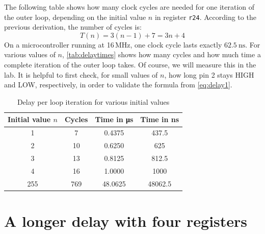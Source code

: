\documentclass[a4paper,12pt]{article}
\begin{document}
The following table shows how many clock cycles are needed for one iteration
of the outer loop, depending on the initial value \( n \) in register
\texttt{r24}. According to the previous derivation, the number of cycles
is:
\begin{equation}
    \label{eq:delay1}
    T(n) = 3(n - 1) + 7 = 3n + 4
\end{equation}
On a microcontroller running at 16\,MHz, one clock cycle lasts exactly
\( \SI{62.5}{\nano\second} \).
For various values of \( n \), \autoref{tab:delaytimes} shows how many
cycles and how much time a complete iteration of the outer loop takes.
Of course, we will measure this in the lab. It is helpful to first check,
for small values of \( n \), how long pin 2 stays HIGH and LOW,
respectively, in order to validate the formula from \eqref{eq:delay1}.

\begin{table}[H]
\centering
\begin{tabular}{c c c c}
\toprule
Initial value \( n \) & Cycles & Time in \si{\micro\second} & Time in \si{\nano\second} \\
\midrule
1   & 7   & 0.4375  & 437.5 \\
2   & 10  & 0.6250  & 625 \\
3   & 13  & 0.8125  & 812.5 \\
4   & 16  & 1.0000  & 1000 \\
255 & 769 & 48.0625 & 48062.5 \\
\bottomrule
\end{tabular}
\caption{Delay per loop iteration for various initial values}
\label{tab:delaytimes}
\end{table}


\newpage
\section{A longer delay with four registers}
\end{document}
